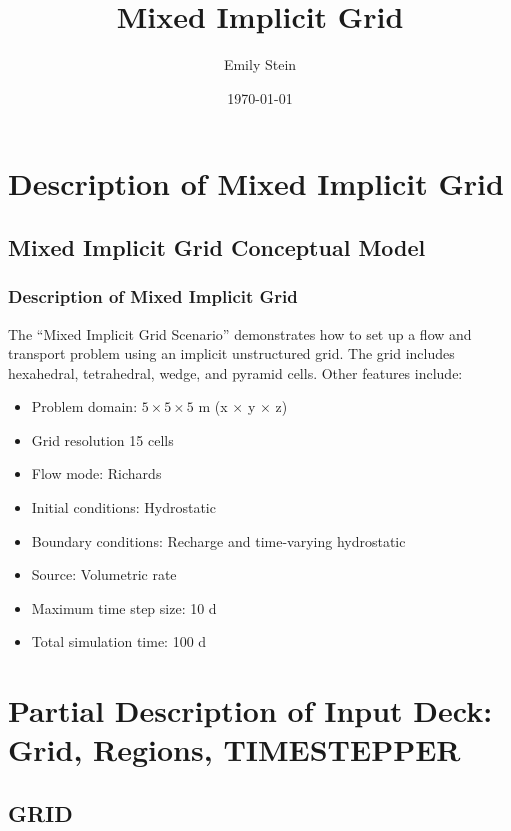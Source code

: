 \documentclass{beamer}
\begin{document}
\title{Mixed Implicit Grid}
\author{Emily Stein}
\date{\today}


\section{Description of Mixed Implicit Grid}

\subsection{Mixed Implicit Grid Conceptual Model}

\begin{frame}\frametitle{Description of Mixed Implicit Grid}
The ``Mixed Implicit Grid Scenario'' demonstrates how to set up a flow and transport problem using an implicit unstructured grid.  The grid includes hexahedral, tetrahedral, wedge, and pyramid cells.  Other features include:
\begin{itemize}
  \item Problem domain: $5 \times 5 \times 5$ m (x $\times$ y $\times$ z)
  \item Grid resolution 15 cells
  \item Flow mode: Richards
  \item Initial conditions: Hydrostatic
  \item Boundary conditions: Recharge and time-varying hydrostatic
  \item Source: Volumetric rate
  \item Maximum time step size: 10 d
  \item Total simulation time: 100 d
\end{itemize}

\end{frame}

\section{Partial Description of Input Deck: Grid, Regions, TIMESTEPPER}

\subsection{GRID}
\end{document}
